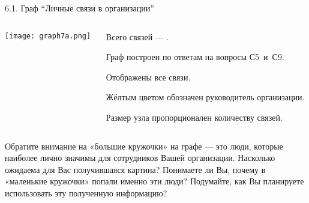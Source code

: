 \begin{frame}{6.1. Граф ``Личные связи в организации''}

\begin{columns}
\begin{column}{0.7\textwidth} 
\centering
          \texttt{[image: graph7a.png]}
\end{column}
\begin{column}{0.25\textwidth}
\tiny

Всего связей --- \valGAlinks.
\smallskip

Граф построен по ответам на вопросы С5~и~С9.
\smallskip

\socioSizeComment
\smallskip

Отображены все связи. 
\smallskip

Жёлтым цветом обозначен руководитель организации.
\smallskip

Размер узла пропорционален количеству связей.

\end{column}
\end{columns}

\fontsize{6pt}{7}\selectfont
Обратите внимание на «большие кружочки» на графе --- это люди, которые наиболее лично значимы для сотрудников 
Вашей организации. Насколько ожидаема для Вас получившаяся картина? Понимаете ли Вы, почему в «маленькие кружочки» 
попали именно эти люди? Подумайте, как Вы планируете использовать эту полученную информацию?

\end{frame}


